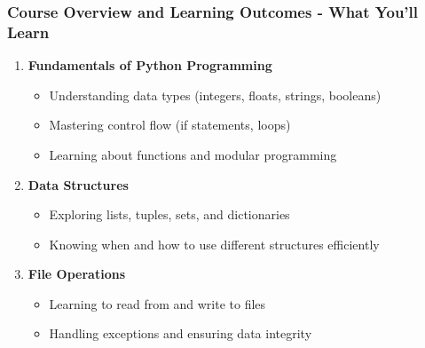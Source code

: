 \documentclass{beamer}
\begin{document}
\begin{frame}[fragile]
    \frametitle{Course Overview and Learning Outcomes - What You'll Learn}
    \begin{enumerate}
        \item \textbf{Fundamentals of Python Programming}
        \begin{itemize}
            \item Understanding data types (integers, floats, strings, booleans)
            \item Mastering control flow (if statements, loops)
            \item Learning about functions and modular programming 
        \end{itemize}

        \item \textbf{Data Structures}
        \begin{itemize}
            \item Exploring lists, tuples, sets, and dictionaries
            \item Knowing when and how to use different structures efficiently
        \end{itemize}
        
        \item \textbf{File Operations}
        \begin{itemize}
            \item Learning to read from and write to files
            \item Handling exceptions and ensuring data integrity
        \end{itemize}
    \end{enumerate}
\end{frame}
\end{document}
